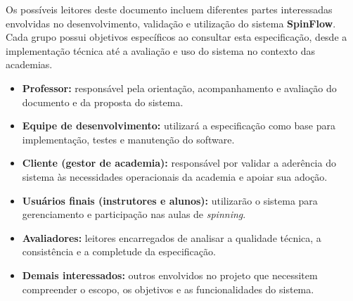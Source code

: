 
Os possíveis leitores deste documento incluem diferentes partes interessadas envolvidas no desenvolvimento, validação e utilização do sistema \textbf{SpinFlow}. Cada grupo possui objetivos específicos ao consultar esta especificação, desde a implementação técnica até a avaliação e uso do sistema no contexto das academias.

\begin{itemize}[leftmargin=1.2cm]
    \item \textbf{Professor:} responsável pela orientação, acompanhamento e avaliação do documento e da proposta do sistema.
    \item \textbf{Equipe de desenvolvimento:} utilizará a especificação como base para implementação, testes e manutenção do software.
    \item \textbf{Cliente (gestor de academia):} responsável por validar a aderência do sistema às necessidades operacionais da academia e apoiar sua adoção.
    \item \textbf{Usuários finais (instrutores e alunos):} utilizarão o sistema para gerenciamento e participação nas aulas de \textit{spinning}.
    \item \textbf{Avaliadores:} leitores encarregados de analisar a qualidade técnica, a consistência e a completude da especificação.
    \item \textbf{Demais interessados:} outros envolvidos no projeto que necessitem compreender o escopo, os objetivos e as funcionalidades do sistema.
\end{itemize}
